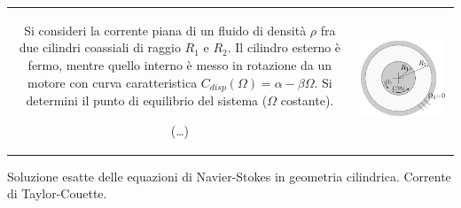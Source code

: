 \noindent
\begin{tabular}{cc}
\begin{minipage}{0.60\textwidth}
\begin{exerciseS}
Si consideri la corrente piana di un fluido di densità $\rho$ fra due cilindri coassiali di raggio $R_1$ e $R_2$. Il cilindro esterno è fermo, mentre quello interno è messo in rotazione da un motore con curva caratteristica $C_{disp}(\Omega) = \alpha - \beta \Omega$.
Si determini il punto di equilibrio del sistema ($\Omega$ costante).
 
(\dots)
\end{exerciseS}
\end{minipage}
&
\begin{minipage}{0.35\textwidth}
   \begin{center}
   \includegraphics[width=0.95\textwidth]{./fig/slnEsatte-taylor-couette}
   \end{center}
\end{minipage}
\end{tabular}

\sol

\partone Soluzione esatte delle equazioni di Navier-Stokes in geometria cilindrica. Corrente di Taylor-Couette.

